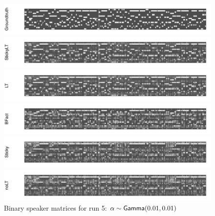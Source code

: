 \begin{figure}[tb]
\begin{center}
  \centerline{\includegraphics[width = \textwidth, height = 0.2\textwidth]{fig/cocktail/synth_s16_m12/hyper_alpha/h10.0_nocs_cp0/a0p01b0p01/groundtruth.pdf}}
  \centerline{\includegraphics[width = \textwidth, height = 0.2\textwidth]{fig/cocktail/synth_s16_m12/hyper_alpha/h10.0_nocs_cp0/a0p01b0p01/StickyLT_hdp_hmm_w0_aalpha0p01_balpha0p01/binary_state.pdf}}
  \centerline{\includegraphics[width = \textwidth, height = 0.2\textwidth]{fig/cocktail/synth_s16_m12/hyper_alpha/h10.0_nocs_cp0/a0p01b0p01/LT_hdp_hmm_w0_aalpha0p01_balpha0p01/binary_state.pdf}}
  \centerline{\includegraphics[width = \textwidth, height = 0.2\textwidth]{fig/cocktail/synth_s16_m12/hyper_alpha/h10.0_nocs_cp0/a0p01b0p01/BFact_hmm_w0_aalpha0p01_balpha0p01/binary_state.pdf}}
  \centerline{\includegraphics[width = \textwidth, height = 0.2\textwidth]{fig/cocktail/synth_s16_m12/hyper_alpha/h10.0_nocs_cp0/a0p01b0p01/Sticky_hdp_hmm_w0_aalpha0p01_balpha0p01/binary_state.pdf}}
  \centerline{\includegraphics[width = \textwidth, height = 0.2\textwidth]{fig/cocktail/synth_s16_m12/hyper_alpha/h10.0_nocs_cp0/a0p01b0p01/noLT_hdp_hmm_w0_aalpha0p01_balpha0p01/binary_state.pdf}}
\caption{Binary speaker matrices for run 5: $\alpha \sim \mathsf{Gamma}(0.01,0.01)$}
\end{center}
\end{figure}



